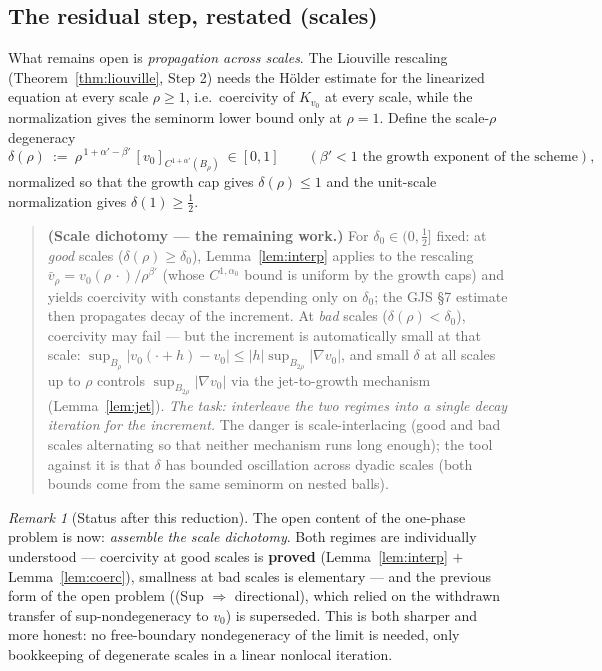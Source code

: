 \documentclass[11pt]{amsart}
\theoremstyle{plain}
\theoremstyle{definition}
\theoremstyle{remark}
\newtheorem{remark}[theorem]{Remark}
\newcommand{\al}{\alpha}
\begin{document}
\subsection{The residual step, restated (scales)}
What remains open is \emph{propagation across scales}. The Liouville rescaling
(Theorem~\ref{thm:liouville}, Step 2) needs the H\"older estimate for the
linearized equation at every scale $\rho\ge1$, i.e.\ coercivity of $K_{v_0}$ at
every scale, while the normalization gives the seminorm lower bound only at
$\rho=1$. Define the scale-$\rho$ degeneracy
\[
  \delta(\rho)\ :=\ \rho^{\,1+\al'-\beta'}\,[v_0]_{C^{1+\al'}(B_\rho)}
  \ \in[0,1]
  \qquad(\beta'<1\text{ the growth exponent of the scheme}),
\]
normalized so that the growth cap gives $\delta(\rho)\le1$ and the unit-scale
normalization gives $\delta(1)\ge\frac12$.

\begin{quote}
\textbf{(Scale dichotomy --- the remaining work.)} For $\delta_0\in(0,\tfrac12]$
fixed: at \emph{good} scales ($\delta(\rho)\ge\delta_0$),
Lemma~\ref{lem:interp} applies to the rescaling
$\bar v_\rho=v_0(\rho\,\cdot)/\rho^{\beta'}$ (whose $C^{1,\al_0}$ bound is
uniform by the growth caps) and yields coercivity with constants depending only
on $\delta_0$; the GJS \S7 estimate then propagates decay of the increment. At
\emph{bad} scales ($\delta(\rho)<\delta_0$), coercivity may fail --- but the
increment is automatically small at that scale:
$\sup_{B_\rho}|v_0(\cdot+h)-v_0|\le|h|\sup_{B_{2\rho}}|\nabla v_0|$, and small
$\delta$ at all scales up to $\rho$ controls $\sup_{B_{2\rho}}|\nabla v_0|$ via
the jet-to-growth mechanism (Lemma~\ref{lem:jet}). \emph{The task: interleave
the two regimes into a single decay iteration for the increment.} The danger is
scale-interlacing (good and bad scales alternating so that neither mechanism
runs long enough); the tool against it is that $\delta$ has bounded oscillation
across dyadic scales (both bounds come from the same seminorm on nested balls).
\end{quote}

\begin{remark}[Status after this reduction]\label{rem:crux}
The open content of the one-phase problem is now: \emph{assemble the scale
dichotomy}. Both regimes are individually understood --- coercivity at good
scales is \textbf{proved} (Lemma~\ref{lem:interp} $+$ Lemma~\ref{lem:coerc}),
smallness at bad scales is elementary --- and the previous form of the open
problem (\textnormal{(Sup $\Rightarrow$ directional)}, which relied on the
withdrawn transfer of sup-nondegeneracy to $v_0$) is superseded. This is both
sharper and more honest: no free-boundary nondegeneracy of the limit is needed,
only bookkeeping of degenerate scales in a linear nonlocal iteration.
\end{remark}
\end{document}
